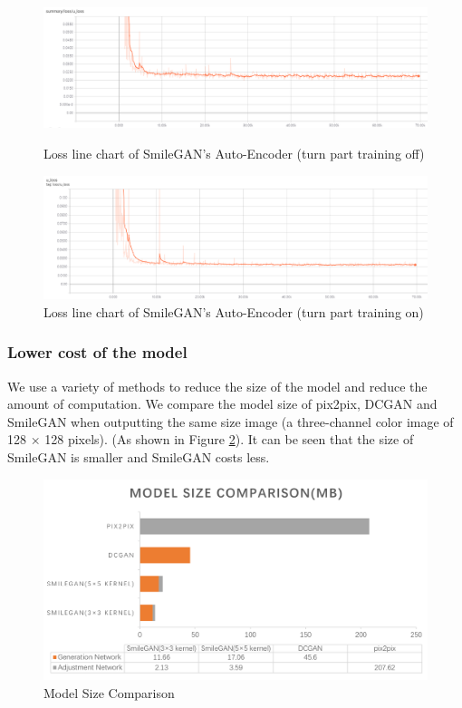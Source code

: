 \begin{figure}
    \begin{minipage}[t]{0.49\linewidth}
        \centering
        \includegraphics[width=\textwidth]{figures/loss_part_off_u.png}
        \caption{Loss line chart of SmileGAN's Auto-Encoder (turn part training off)}
        \label{loss_part_off_u}
    \end{minipage}
        \hfill
    \begin{minipage}[t]{0.49\linewidth}
        \centering
        \includegraphics[width=\textwidth]{figures/loss_part_on_u.png}
        \caption{Loss line chart of SmileGAN's Auto-Encoder (turn part training on)}
        \label{loss_part_on_u}
    \end{minipage}
\end{figure}


\subsubsection*{Lower cost of the model}
We use a variety of methods to reduce the size of the model and reduce the amount of computation.
We compare the model size of pix2pix, DCGAN and SmileGAN when outputting the same size image (a three-channel color image of 128 × 128 pixels).
(As shown in Figure \ref{result_model_size}).
It can be seen that the size of SmileGAN is smaller and SmileGAN costs less.

\begin{figure}
    \begin{center}
    \includegraphics[width=\textwidth]{figures/result_model_size.png}
    \caption{Model Size Comparison}
    \label{result_model_size}
    \end{center}
\end{figure}